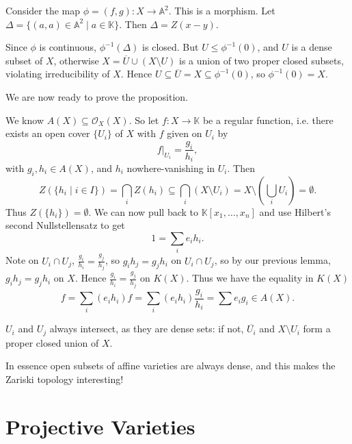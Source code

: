 \documentclass[12pt]{article}
\begin{document}
\begin{proofbox}
	Consider the map $\phi = (f, g) : X \to \mathbb{A}^2$. This is a morphism. Let $\Delta = \{(a, a) \in \mathbb{A}^2 \mid a \in \mathbb{K}\}$. Then $\Delta = Z(x - y)$.

	Since $\phi$ is continuous, $\phi^{-1}(\Delta)$ is closed. But $U \leq \phi^{-1}(0)$, and $U$ is a dense subset of $X$, otherwise $X = \overline{U} \cup (X \setminus U)$ is a union of two proper closed subsets, violating irreducibility of $X$. Hence $U \subseteq \overline{U} = X \subseteq \phi^{-1}(0)$, so $\phi^{-1}(0) = X$.
\end{proofbox}

We are now ready to prove the proposition.

\begin{proofbox}
	We know $A(X) \subseteq \mathcal{O}_X(X)$. So let $f : X \to \mathbb{K}$ be a regular function, i.e. there exists an open cover $\{U_i\}$ of $X$ with $f$ given on $U_i$ by
	\[
	f|_{U_i} = \frac{g_i}{h_i},
	\]
	with $g_i, h_i \in A(X)$, and $h_i$ nowhere-vanishing in $U_i$. Then
	\[
		Z(\{h_i \mid i \in I\}) = \bigcap_i Z(h_i) \subseteq \bigcap_i \left( X \setminus U_i \right) = X \setminus \left( \bigcup_i U_i \right) = \emptyset.
	\]
	Thus $Z(\{h_i\}) = \emptyset$. We can now pull back to $\mathbb{K}[x_1, \ldots, x_n]$ and use Hilbert's second Nullstellensatz to get
	\[
	1 = \sum_i e_i h_i.
	\]
	Note on $U_i \cap U_j$, $\frac{g_i}{h_i} = \frac{g_j}{h_j}$, so $g_i h_j = g_j h_i$ on $U_i \cap U_j$, so by our previous lemma, $g_i h_j = g_j h_i$ on $X$. Hence $\frac{g_i}{h_i} = \frac{g_j}{h_j}$ on $K(X)$. Thus we have the equality in $K(X)$ 
	\[
	f = \sum_i (e_i h_i) f = \sum_i (e_i h_i) \frac{g_i}{h_i} = \sum e_i g_i \in A(X).
	\]
\end{proofbox}

\begin{remark}
	$U_i$ and $U_j$ always intersect, as they are dense sets: if not, $\overline{U_i}$ and $X \setminus U_i$ form a proper closed union of $X$.

	In essence open subsets of affine varieties are always dense, and this makes the Zariski topology interesting!
\end{remark}


\newpage

\section{Projective Varieties}
\label{sec:proj_var}
\end{document}
